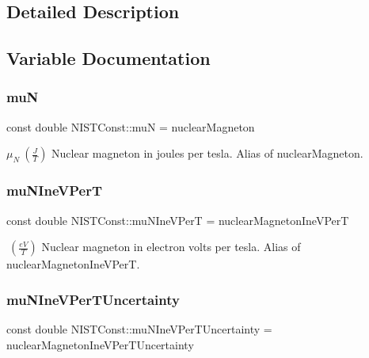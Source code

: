 \subsection{Detailed Description}


\subsection{Variable Documentation}
\mbox{\label{group___n_i_s_t_const-_nuclear_magneton_ga5b19bcb311479cc6f5c36b551356e580}} 
\subsubsection{\texorpdfstring{muN}{muN}}
{\footnotesize\ttfamily const double N\+I\+S\+T\+Const\+::muN = nuclear\+Magneton}

$\mu_N \ (\frac{J}{T})$ Nuclear magneton in joules per tesla. Alias of nuclear\+Magneton. \mbox{\label{group___n_i_s_t_const-_nuclear_magneton_ga2c8a56a6542df06b37fed3b2b5444ff6}} 
\subsubsection{\texorpdfstring{mu\+N\+Ine\+V\+PerT}{muNIneVPerT}}
{\footnotesize\ttfamily const double N\+I\+S\+T\+Const\+::mu\+N\+Ine\+V\+PerT = nuclear\+Magneton\+Ine\+V\+PerT}

$ \ (\frac{eV}{T})$ Nuclear magneton in electron volts per tesla. Alias of nuclear\+Magneton\+Ine\+V\+PerT. \mbox{\label{group___n_i_s_t_const-_nuclear_magneton_ga9dc78b16dc28b0355f5b8c71b5d7f25c}} 
\subsubsection{\texorpdfstring{mu\+N\+Ine\+V\+Per\+T\+Uncertainty}{muNIneVPerTUncertainty}}
{\footnotesize\ttfamily const double N\+I\+S\+T\+Const\+::mu\+N\+Ine\+V\+Per\+T\+Uncertainty = nuclear\+Magneton\+Ine\+V\+Per\+T\+Uncertainty}

